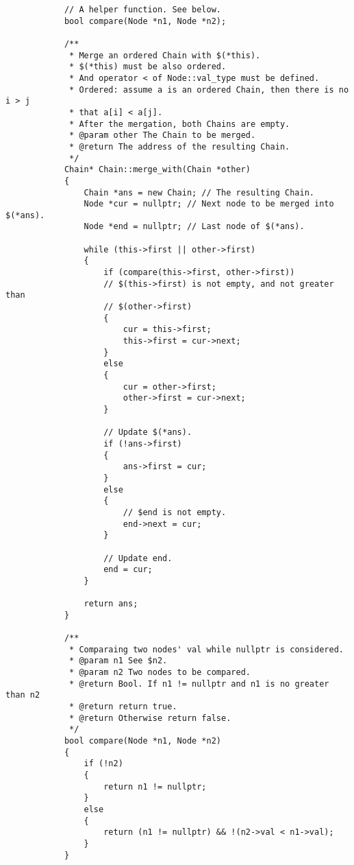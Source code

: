 \documentclass{report}
\begin{document}
        \begin{verbatim}
            // A helper function. See below.
            bool compare(Node *n1, Node *n2);

            /**
             * Merge an ordered Chain with $(*this).
             * $(*this) must be also ordered.
             * And operator < of Node::val_type must be defined.
             * Ordered: assume a is an ordered Chain, then there is no i > j
             * that a[i] < a[j].
             * After the mergation, both Chains are empty.
             * @param other The Chain to be merged.
             * @return The address of the resulting Chain.
             */
            Chain* Chain::merge_with(Chain *other)
            {
                Chain *ans = new Chain; // The resulting Chain.
                Node *cur = nullptr; // Next node to be merged into $(*ans).
                Node *end = nullptr; // Last node of $(*ans).

                while (this->first || other->first)
                {
                    if (compare(this->first, other->first))
                    // $(this->first) is not empty, and not greater than
                    // $(other->first)
                    {
                        cur = this->first;
                        this->first = cur->next;
                    }
                    else
                    {
                        cur = other->first;
                        other->first = cur->next;
                    }

                    // Update $(*ans).
                    if (!ans->first)
                    {
                        ans->first = cur;
                    }
                    else
                    {
                        // $end is not empty.
                        end->next = cur;
                    }

                    // Update end.
                    end = cur;
                }

                return ans;
            }

            /**
             * Comparaing two nodes' val while nullptr is considered.
             * @param n1 See $n2.
             * @param n2 Two nodes to be compared.
             * @return Bool. If n1 != nullptr and n1 is no greater than n2
             * @return return true.
             * @return Otherwise return false.
             */
            bool compare(Node *n1, Node *n2)
            {
                if (!n2)
                {
                    return n1 != nullptr;
                }
                else
                {
                    return (n1 != nullptr) && !(n2->val < n1->val);
                }
            }

        \end{verbatim}
\end{document}
